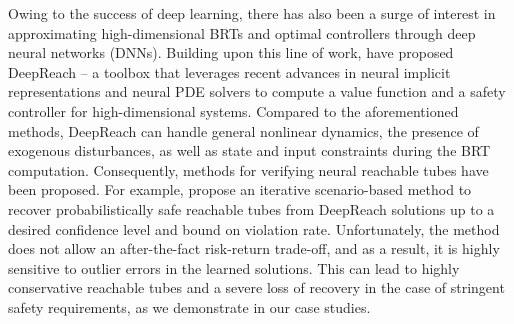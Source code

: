 Owing to the success of deep learning, there has also been a surge of interest in approximating high-dimensional BRTs \citep{rubies2019classification, fisac2019bridging, djeridane2006neural, niarchos2006neural, darbon2020overcoming} and optimal controllers \citep{onken2022neural} through deep neural networks (DNNs).
Building upon this line of work, \citet{bansal2021deepreach} have proposed DeepReach -- a toolbox that leverages recent advances in neural implicit representations and neural PDE solvers to compute a value function and a safety controller for high-dimensional systems.
Compared to the aforementioned methods, DeepReach can handle general nonlinear dynamics, the presence of exogenous disturbances, as well as state and input constraints during the BRT computation.
Consequently, methods for verifying neural reachable tubes have been proposed. For example, \citet{lin2023generating} propose an iterative scenario-based method \citep{campi2009scenario} to recover probabilistically safe reachable tubes from DeepReach solutions up to a desired confidence level and bound on violation rate. Unfortunately, the method does not allow an after-the-fact risk-return trade-off, and as a result, it is highly sensitive to outlier errors in the learned solutions. This can lead to highly conservative reachable tubes and a severe loss of recovery in the case of stringent safety requirements, as we demonstrate in our case studies.

